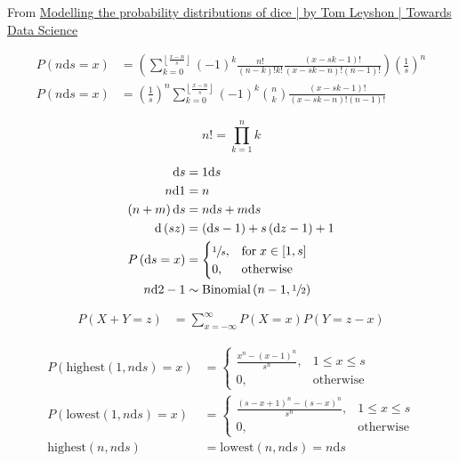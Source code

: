 \documentclass{article}
\newcommand\p[1]{\left( #1 \right)}
\renewcommand{\d}{\text{d}}
\begin{document}
From \href{https://towardsdatascience.com/modelling-the-probability-distributions-of-dice-b6ecf87b24ea}
{Modelling the probability distributions of dice | by Tom Leyshon | Towards Data Science}

\begin{align}
    P(n\d s=x) & =\p{\sum_{k=0}^{\left\lfloor \frac{x-n}{s}\right\rfloor}\p{-1}^k\frac{n!}{\p{n-k}!k!}\frac{\p{x-sk-1}!}{\p{x-sk-n}!\p{n-1}!}}\p{\frac{1}{s}}^n \\
    P(n\d s=x) & =\p{\frac{1}{s}}^n\sum_{k=0}^{\left\lfloor \frac{x-n}{s}\right\rfloor}\p{-1}^k{n \choose k}\frac{\p{x-sk-1}!}{\p{x-sk-n}!\p{n-1}!}
\end{align}

\[
    n! = \prod_{k=1}^{n}k
\]

\begin{align}
    \d s        & = 1\d s                                                  \\
    n\d 1       & = n                                                      \\
    \p{n+m}\d s & = n\d s + m\d s                                          \\
    \d \p{sz}   & = \p{\d s - 1} + s\p{\d z - 1} + 1                       \\
    P\p{\d s=x} & = \begin{cases}
                        \sfrac{1}{s}, & \text{for}\; x \in \left[ 1, s \right] \\
                        0,            & \text{otherwise}
                    \end{cases} \\
    n\d 2 - 1   & \sim \text{Binomial}\p{n-1, \sfrac{1}{2}}
\end{align}

\begin{align}
    P(X+Y=z) & =\sum_{x=-\infty }^{\infty }P(X=x)P(Y=z-x)
\end{align}

\begin{align}
    P\p{\text{highest}\p{1, n\d s}=x} & = \begin{cases}
                                              \frac{x^n-\p{x-1}^n}{s^n}, & 1\leq x\leq s    \\
                                              0,                         & \text{otherwise}
                                          \end{cases}                      \\
    P\p{\text{lowest}\p{1, n\d s}=x}  & = \begin{cases}
                                              \frac{\p{s-x+1}^n-\p{s-x}^n}{s^n}, & 1\leq x\leq s    \\
                                              0,                                 & \text{otherwise}
                                          \end{cases} \\
    \text{highest}\p{n, n\d s}        & = \text{lowest}\p{n, n\d s} = n\d s
\end{align}
\end{document}
